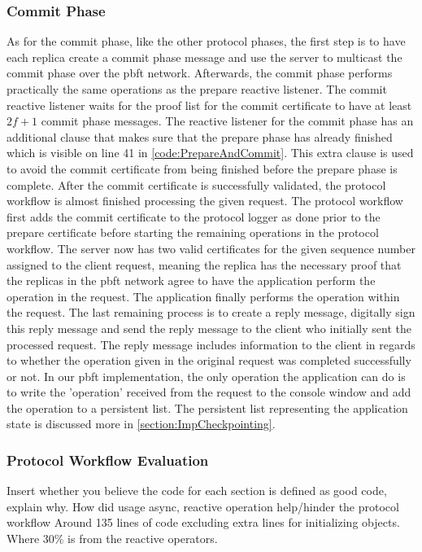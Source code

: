 \subsubsection{Commit Phase}
As for the commit phase, like the other protocol phases, the first step is to have each replica create a commit phase message and use the server to multicast the commit phase over the \ac{pbft} network. Afterwards, the commit phase performs practically the same operations as the prepare reactive listener. The commit reactive listener waits for the proof list for the commit certificate to have at least $2f+1$ commit phase messages. The reactive listener for the commit phase has an additional  clause that makes sure that the prepare phase has already finished which is visible on line 41 in \autoref{code:PrepareAndCommit}. This extra  clause is used to avoid the commit certificate from being finished before the prepare phase is complete.  After the commit certificate is successfully validated, the protocol workflow is almost finished processing the given request. The protocol workflow first adds the commit certificate to the protocol logger as done prior to the prepare certificate before starting the remaining operations in the protocol workflow. The server now has two valid certificates for the given sequence number assigned to the client request, meaning the replica has the necessary proof that the replicas in the \ac{pbft} network agree to have the application perform the operation in the request. The application finally performs the operation within the request. The last remaining process is to create a reply message, digitally sign this reply message and send the reply message to the client who initially sent the processed request. The reply message includes information to the client in regards to whether the operation given in the original request was completed successfully or not. In our \ac{pbft} implementation, the only  operation the application can do is to write the 'operation' received from the request to the console window and add the operation to a persistent list. The persistent list representing the application state is discussed more in \autoref{section:ImpCheckpointing}.


\subsubsection{Protocol Workflow Evaluation}
Insert whether you believe the code for each section is defined as good code, explain why. How did usage async, reactive operation help/hinder the protocol workflow
Around 135 lines of code excluding extra lines for initializing objects. Where 30\% is from the reactive operators.



